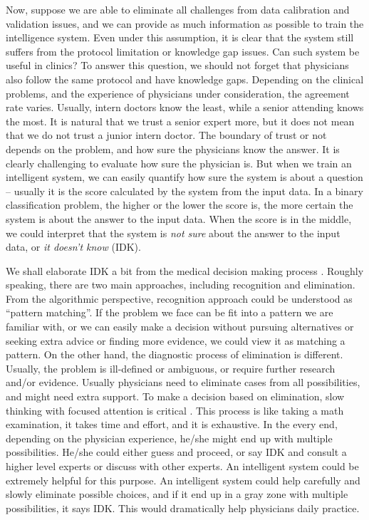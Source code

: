 \documentclass[9pt,twocolumn,twoside]{pnas-new}
\begin{document}

Now, suppose we are able to eliminate all challenges from data calibration and validation issues, and we can provide as much information as possible to train the intelligence system. Even under this assumption, it is clear that the system still suffers from the protocol limitation or knowledge gap issues. Can such system be useful in clinics? To answer this question, we should not forget that physicians also follow the same protocol and have knowledge gaps. Depending on the clinical problems, and the experience of physicians under consideration, the agreement rate varies. Usually, intern doctors know the least, while a senior attending knows the most. It is natural that we trust a senior expert more, but it does not mean that we do not trust a junior intern doctor. The boundary of trust or not depends on the problem, and how sure the physicians know the answer. 
%
It is clearly challenging to evaluate how sure the physician is. But when we train an intelligent system, we can easily quantify how sure the system is about a question -- usually it is the score calculated by the system from the input data. In a binary classification problem, the higher or the lower the score is, the more certain the system is about the answer to the input data. When the score is in the middle, we could interpret that the system is {\em not sure} about the answer to the input data, or {\em it doesn't know} (IDK).

We shall elaborate IDK a bit from the medical decision making process \cite{vordermark2019introduction}. Roughly speaking, there are two main approaches, including recognition and elimination. From the algorithmic perspective, recognition approach could be understood as ``pattern matching''. If the problem we face can be fit into a pattern we are familiar with, or we can easily make a decision without pursuing alternatives or seeking extra advice or finding more evidence, we could view it as matching a pattern. On the other hand, the diagnostic process of elimination is different. Usually, the problem is ill-defined or ambiguous, or require further research and/or evidence. Usually physicians need to eliminate cases from all possibilities, and might need extra support. To make a decision based on elimination, slow thinking with focused attention is critical \cite{michel2020thinking}. This process is like taking a math examination, it takes time and effort, and it is exhaustive. In the every end, depending on the physician experience, he/she might end up with multiple possibilities. He/she could either guess and proceed, or say IDK and consult a higher level experts or discuss with other experts.
An intelligent system could be extremely helpful for this purpose. An intelligent system could help carefully and slowly eliminate possible choices, and if it end up in a gray zone with multiple possibilities, it says IDK. This would dramatically help physicians daily practice. 
\end{document}
